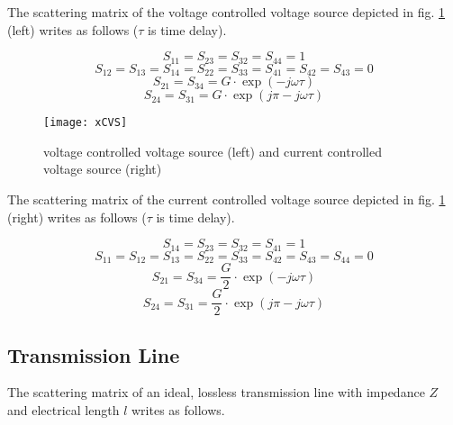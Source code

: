The scattering matrix of the voltage controlled voltage source
depicted in fig. \ref{fig:xCVS} (left) writes as follows ($\tau$ is
time delay).

\begin{equation}
S_{11} = S_{23} = S_{32} = S_{44} = 1
\end{equation}
\begin{equation}
S_{12} = S_{13} = S_{14} = S_{22} = S_{33} = S_{41} = S_{42} = S_{43} = 0
\end{equation}
\begin{equation}
S_{21} = S_{34} = G\cdot \exp\left(-j\omega\tau\right)
\end{equation}
\begin{equation}
S_{24} = S_{31} = G\cdot \exp\left(j\pi-j\omega\tau\right)
\end{equation}

\begin{figure}[ht]
\begin{center}
\texttt{[image: xCVS]}
\end{center}
\caption{voltage controlled voltage source (left) and current controlled voltage source (right)}
\label{fig:xCVS}
\end{figure}
\FloatBarrier

The scattering matrix of the current controlled voltage source
depicted in fig. \ref{fig:xCVS} (right) writes as follows ($\tau$ is
time delay).

\begin{equation}
S_{14} = S_{23} = S_{32} = S_{41} = 1
\end{equation}
\begin{equation}
S_{11} = S_{12} = S_{13} = S_{22} = S_{33} = S_{42} = S_{43} = S_{44} = 0
\end{equation}
\begin{equation}
S_{21} = S_{34} = \frac{G}{2}\cdot \exp\left(-j\omega\tau\right)
\end{equation}
\begin{equation}
S_{24} = S_{31} = \frac{G}{2}\cdot \exp\left(j\pi-j\omega\tau\right)
\end{equation}

\subsection{Transmission Line}

The scattering matrix of an ideal, lossless transmission line with
impedance $Z$ and electrical length $l$ writes as follows.

